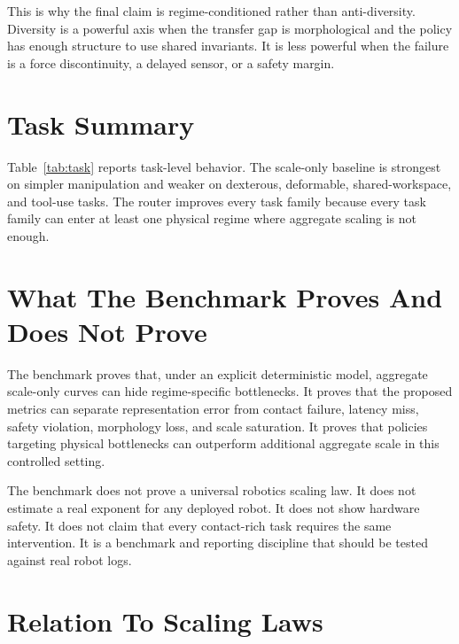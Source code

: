 \documentclass{article}
\begin{document}
This is why the final claim is regime-conditioned rather than anti-diversity. Diversity is a powerful axis when the transfer gap is morphological and the policy has enough structure to use shared invariants. It is less powerful when the failure is a force discontinuity, a delayed sensor, or a safety margin.

\section{Task Summary}

\begin{table}[t]
\centering
\small
\resizebox{\linewidth}{!}{}
\caption{Task-level summary. The router is consistently better than scale-only, while the oracle marks remaining headroom.}
\label{tab:task}
\end{table}

Table~\ref{tab:task} reports task-level behavior. The scale-only baseline is strongest on simpler manipulation and weaker on dexterous, deformable, shared-workspace, and tool-use tasks. The router improves every task family because every task family can enter at least one physical regime where aggregate scaling is not enough.

\section{What The Benchmark Proves And Does Not Prove}

The benchmark proves that, under an explicit deterministic model, aggregate scale-only curves can hide regime-specific bottlenecks. It proves that the proposed metrics can separate representation error from contact failure, latency miss, safety violation, morphology loss, and scale saturation. It proves that policies targeting physical bottlenecks can outperform additional aggregate scale in this controlled setting.

The benchmark does not prove a universal robotics scaling law. It does not estimate a real exponent for any deployed robot. It does not show hardware safety. It does not claim that every contact-rich task requires the same intervention. It is a benchmark and reporting discipline that should be tested against real robot logs.

\section{Relation To Scaling Laws}
\end{document}
